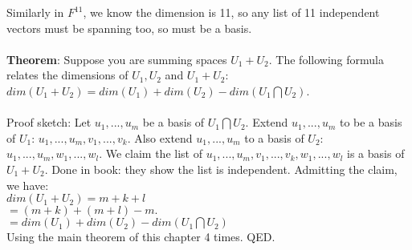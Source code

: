 \documentclass{article}
\begin{document}
Similarly in $F^{11}$, we know the dimension is 11, so any list of 11 independent vectors must be spanning too, so must be a basis. \\\\

\textbf{Theorem}: Suppose you are summing spaces $U_1 + U_2$. The following formula relates the dimensions of $U_1, U_2$ and $U_1 + U_2$: $dim(U_1 + U_2) = dim(U_1) + dim(U_2) - dim(U_1 \bigcap U_2)$. \\ \\ 

Proof sketch: Let $u_1, ..., u_m$ be a basis of $U_1 \bigcap U_2$. Extend $u_1, ..., u_m$ to be a basis of $U_1$: $u_1, ..., u_m, v_1, ..., v_k$. Also extend $u_1, ..., u_m$ to a basis of $U_2$: $u_1, ..., u_m, w_1, ..., w_l$. We claim the list of $u_1, ..., u_m, v_1, ..., v_k, w_1, ..., w_l$ is a basis of $U_1 + U_2$. Done in book: they show the list is independent. Admitting the claim, we have: \\ $dim(U_1 + U_2) = m + k + l$ \\ $= (m+k) + (m+l) -m.$ \\ $=dim(U_1) + dim(U_2) - dim(U_1 \bigcap U_2)$ \\
Using the main theorem of this chapter 4 times. QED. 
\end{document}
